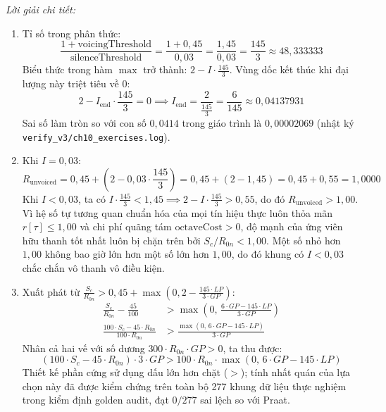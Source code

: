 \textit{Lời giải chi tiết:}
\begin{enumerate}[label=(\alph*)]
    \item Tỉ số trong phân thức:
    \begin{equation*}
        \frac{1 + \text{voicingThreshold}}{\text{silenceThreshold}} = \frac{1 + 0{,}45}{0{,}03} = \frac{1{,}45}{0{,}03} = \frac{145}{3} \approx 48{,}333333
    \end{equation*}
    Biểu thức trong hàm $\max$ trở thành: $2 - I \cdot \frac{145}{3}$. Vùng dốc kết thúc khi đại lượng này triệt tiêu về 0:
    \begin{equation*}
        2 - I_{\text{end}} \cdot \frac{145}{3} = 0 \implies I_{\text{end}} = \frac{2}{\frac{145}{3}} = \frac{6}{145} \approx 0{,}04137931
    \end{equation*}
    Sai số làm tròn so với con số $0{,}0414$ trong giáo trình là $0{,}00002069$ (nhật ký \texttt{verify\_v3/ch10\_exercises.log}).
    \item Khi $I = 0{,}03$:
    \begin{equation*}
        R_{\text{unvoiced}} = 0{,}45 + \left(2 - 0{,}03 \cdot \frac{145}{3}\right) = 0{,}45 + (2 - 1{,}45) = 0{,}45 + 0{,}55 = 1{,}0000
    \end{equation*}
    Khi $I < 0{,}03$, ta có $I \cdot \frac{145}{3} < 1{,}45 \implies 2 - I \cdot \frac{145}{3} > 0{,}55$, do đó $R_{\text{unvoiced}} > 1{,}00$. Vì hệ số tự tương quan chuẩn hóa của mọi tín hiệu thực luôn thỏa mãn $r[\tau] \le 1{,}00$ và chi phí quãng tám $\text{octaveCost} > 0$, độ mạnh của ứng viên hữu thanh tốt nhất luôn bị chặn trên bởi $S_c / R_{0n} < 1{,}00$. Một số nhỏ hơn $1{,}00$ không bao giờ lớn hơn một số lớn hơn $1{,}00$, do đó khung có $I < 0{,}03$ chắc chắn vô thanh vô điều kiện.
    \item Xuất phát từ $\frac{S_c}{R_{0n}} > 0{,}45 + \max\left(0, 2 - \frac{145 \cdot LP}{3 \cdot GP}\right)$:
    \begin{align*}
        \frac{S_c}{R_{0n}} - \frac{45}{100} &> \max\left(0,\, \frac{6 \cdot GP - 145 \cdot LP}{3 \cdot GP}\right) \\
        \frac{100 \cdot S_c - 45 \cdot R_{0n}}{100 \cdot R_{0n}} &> \frac{\max(0,\, 6 \cdot GP - 145 \cdot LP)}{3 \cdot GP}
    \end{align*}
    Nhân cả hai vế với số dương $300 \cdot R_{0n} \cdot GP > 0$, ta thu được:
    \begin{equation*}
        (100 \cdot S_c - 45 \cdot R_{0n}) \cdot 3 \cdot GP > 100 \cdot R_{0n} \cdot \max(0,\, 6 \cdot GP - 145 \cdot LP)
    \end{equation*}
    Thiết kế phần cứng sử dụng dấu lớn hơn chặt ($>$); tính nhất quán của lựa chọn này đã được kiểm chứng trên toàn bộ 277 khung dữ liệu thực nghiệm trong kiểm định golden audit, đạt $0/277$ sai lệch so với Praat.
\end{enumerate}

